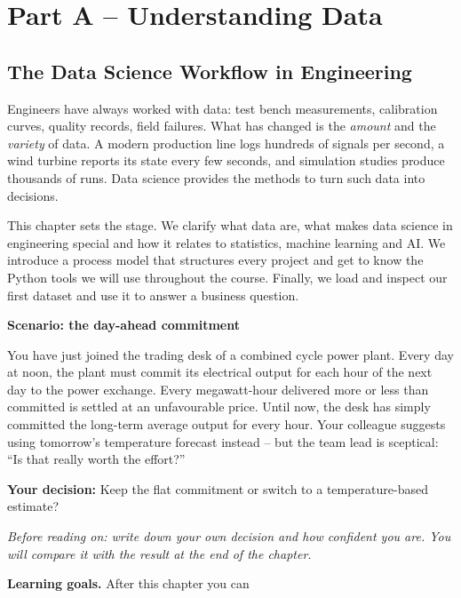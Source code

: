 \documentclass[
  letterpaper,
  DIV=11,
  numbers=noendperiod]{scrreprt}
\begin{document}
\part{Part A -- Understanding Data}

\chapter{The Data Science Workflow in
Engineering}\label{the-data-science-workflow-in-engineering}

Engineers have always worked with data: test bench measurements,
calibration curves, quality records, field failures. What has changed is
the \emph{amount} and the \emph{variety} of data. A modern production
line logs hundreds of signals per second, a wind turbine reports its
state every few seconds, and simulation studies produce thousands of
runs. Data science provides the methods to turn such data into
decisions.

This chapter sets the stage. We clarify what data are, what makes data
science in engineering special and how it relates to statistics, machine
learning and AI. We introduce a process model that structures every
project and get to know the Python tools we will use throughout the
course. Finally, we load and inspect our first dataset and use it to
answer a business question.

\textbf{Scenario: the day-ahead commitment}

You have just joined the trading desk of a combined cycle power plant.
Every day at noon, the plant must commit its electrical output for each
hour of the next day to the power exchange. Every megawatt-hour
delivered more or less than committed is settled at an unfavourable
price. Until now, the desk has simply committed the long-term average
output for every hour. Your colleague suggests using tomorrow's
temperature forecast instead -- but the team lead is sceptical: ``Is
that really worth the effort?''

\textbf{Your decision:} Keep the flat commitment or switch to a
temperature-based estimate?

\emph{Before reading on: write down your own decision and how confident
you are. You will compare it with the result at the end of the chapter.}

\textbf{Learning goals.} After this chapter you can
\end{document}
